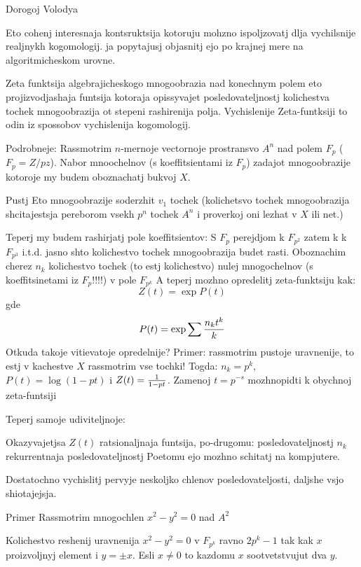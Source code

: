 




  Dorogoj Volodya

 Eto cohenj interesnaja kontsruktsija
kotoruju mohzno ispoljzovatj dlja vychilsnije realjnykh kogomologij.
ja popytajusj objasnitj ejo po krajnej mere na algoritmicheskom urovne.



Zeta funktsija algebrajicheskogo mnogoobrazia nad konechnym polem
eto projizvodjashaja funtsija kotoraja opissyvajet
posledovateljnostj kolichestva tochek mnogoobrazija
ot stepeni rashirenija polja.
 Vychislenije Zeta-funtksiji to odin iz spossobov vychislenija
kogomologij.


 Podrobneje:
Rassmotrim $n$-mernoje vectornoje prostransvo $A^n$
nad polem $F_p$  ($F_p=Z/pz$).
Nabor mnoochelnov (s koeffitsientami iz $F_p$) zadajot
mnogoobrazije kotoroje my budem oboznachatj bukvoj $X$.

Pustj Eto mnogoobrazije soderzhit $v_1$ tochek
(kolichetsvo tochek mnogoobrazija shcitajestsja pereborom vsekh $p^n$
tochek $A^n$ i proverkoj oni lezhat v $X$ ili net.)

Teperj my budem rashirjatj pole koeffitsientov:
S  $F_p$ perejdjom k $F_{p^2}$ zatem k k $F_{p^3}$ i.t.d.
jasno shto kolichestvo tochek mnogoobrazija budet rasti.
Oboznachim cherez $n_k$ kolichestvo tochek (to estj kolichestvo)
nulej mnogochelnov (s koeffitsinetami iz $F_p$!!!!)
v pole $F_{p^k}$
A teperj mozhno opredelitj zeta-funktsiju kak:
                $$
Z(t)=\exp P(t)
                  $$
gde
             $$
           P(t)=\exp \sum {n_kt^k\over k}
             $$
Otkuda takoje vitievatoje opredelnije?
 Primer: rassmotrim pustoje uravnenije, to estj
 v kachestve $X$ rassmotrim vse  tochki! Togda:
      $n_k=p^k$, $P(t)=\log (1-pt)$ i
$Z(t)={1\over 1-pt}$. Zamenoj $t=p^{-s}$ mozhnopidti k obychnoj
zeta-funtsiji

 Teperj samoje udiviteljnoje:

  Okazyvajetjsa $Z(t)$ ratsionaljnaja funtsija, po-drugomu:
posledovateljnostj $n_k$ rekurrentnaja posledovateljnostj
 Poetomu ejo mozhno schitatj na kompjutere.

 Dostatochno vychislitj pervyje neskoljko chlenov posledovateljosti,
daljshe vsjo shiotajejsja.


 Primer Rassmotrim mnogochlen $x^2-y^2=0$ nad $A^2$

Kolichestvo reshenij  uravnenija $x^2-y^2=0$ v $F_{p^k}$
ravno $2p^k-1$ tak kak $x$ proizvoljnyj element i  $y=\pm x$.
Esli $x\not =0$ to  kazdomu $x$ sootvetstvujut dva $y$.

